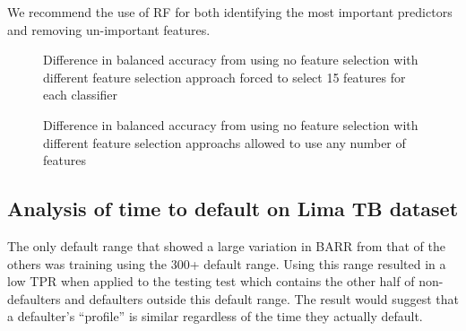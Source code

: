 \documentclass{sig-alternate-05-2015}
\begin{document}
	We recommend the use of RF for both identifying the most important predictors and removing un-important features.
	
	\begin{figure}
		\centering
		\caption{Difference in balanced accuracy from using no feature selection with different feature selection approach forced to select 15 features for each classifier}
		\label{fig:feature_selection_limit_15}
	\end{figure}
	
	\begin{figure}
		\centering
		\caption{Difference in balanced accuracy from using no feature selection with different feature selection approachs allowed to use any number of features}
		\label{fig:feature_selection_unlimited}
	\end{figure}
	
	\subsection{Analysis of time to default on Lima TB dataset}
	The only default range that showed a large variation in BARR from that of the others was training using the 300+ default range. Using this range resulted in a low TPR when applied to the testing test which contains the other half of non-defaulters and defaulters outside this default range. The result would suggest that a defaulter's ``profile'' is similar regardless of the time they actually default.	
	
\end{document}
